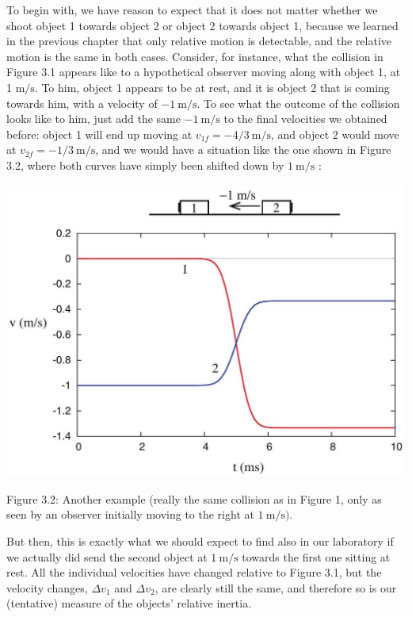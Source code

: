 \documentclass[10pt]{article}
\begin{document}
To begin with, we have reason to expect that it does not matter whether we shoot object 1 towards object 2 or object 2 towards object 1, because we learned in the previous chapter that only relative motion is detectable, and the relative motion is the same in both cases. Consider, for instance, what the collision in Figure 3.1 appears like to a hypothetical observer moving along with object 1, at 1 $\mathrm{m} / \mathrm{s}$. To him, object 1 appears to be at rest, and it is object 2 that is coming towards him, with a velocity of $-1 \mathrm{~m} / \mathrm{s}$. To see what the outcome of the collision looks like to him, just add the same $-1 \mathrm{~m} / \mathrm{s}$ to the final velocities we obtained before: object 1 will end up moving at $v_{1 f}=-4 / 3 \mathrm{~m} / \mathrm{s}$, and object 2 would move at $v_{2 f}=-1 / 3 \mathrm{~m} / \mathrm{s}$, and we would have a situation like the one shown in Figure 3.2, where both curves have simply been shifted down by $1 \mathrm{~m} / \mathrm{s}$ :

\begin{center}
\includegraphics[max width=\textwidth]{2024_09_14_9969b06773f10b6936e8g-071}
\end{center}

Figure 3.2: Another example (really the same collision as in Figure 1, only as seen by an observer initially moving to the right at $1 \mathrm{~m} / \mathrm{s})$.

But then, this is exactly what we should expect to find also in our laboratory if we actually did send the second object at $1 \mathrm{~m} / \mathrm{s}$ towards the first one sitting at rest. All the individual velocities have changed relative to Figure 3.1, but the velocity changes, $\Delta v_{1}$ and $\Delta v_{2}$, are clearly still the same, and therefore so is our (tentative) measure of the objects' relative inertia.
\end{document}
